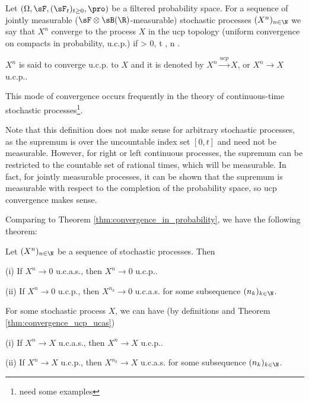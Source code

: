 \begin{definition}\label{def:ucp_convergence_process}
Let $(\Omega,\sF,(\sF_t)_{t\geq 0},\pro)$ be a filtered probability space. For a sequence of jointly measurable ($\sF\otimes \sB(\R)$-measurable) stochastic processes $(X^n)_{n\in \N}$ we say that $X^n$ converge to the process $X$ in the ucp topology (uniform convergence on compacts in probability, u.c.p.) if
\be
\forall \ve > 0, \forall t ,\quad \pro{}  \quad {}n \to\infty.
\ee

$X^n$ is said to converge u.c.p. to $X$ and it is denoted by $X^n \xrightarrow{ucp}X$, or $X^n \to X$ u.c.p..
\end{definition}

\begin{remark}
This mode of convergence occurs frequently in the theory of continuous-time stochastic processes\footnote{need some examples}.

Note that this definition does not make sense for arbitrary stochastic processes, as the supremum is over the uncountable index set $[0,t]$ and need not be measurable. However, for right or left continuous processes, the supremum can be restricted to the countable set of rational times, which will be measurable. In fact, for jointly measurable processes, it can be shown that the supremum is measurable with respect to the completion of the probability space, so ucp convergence makes sense.
\end{remark}

Comparing to Theorem \ref{thm:convergence_in_probability}, we have the following theorem:

\begin{theorem}\label{thm:convergence_ucp_ucas}%
Let $(X^n)_{n \in \N}$ be a sequence of stochastic processes. Then
\ben
\item [(i)] If $X^n \to 0$ u.c.a.s., then $X^n \to 0$ u.c.p..
\item [(ii)] If $X^n \to 0$ u.c.p., then $X^{n_k}\to 0$ u.c.a.s. for some subsequence $(n_k)_{k\in \N}$.
\een
\end{theorem}

\begin{remark}
For some stochastic process $X$, we can have (by definitions and Theorem \ref{thm:convergence_ucp_ucas})
\ben
\item [(i)] If $X^n \to X$ u.c.a.s., then $X^n \to X$ u.c.p..
\item [(ii)] If $X^n \to X$ u.c.p., then $X^{n_k}\to X$ u.c.a.s. for some subsequence $(n_k)_{k\in \N}$.
\een
\end{remark}

